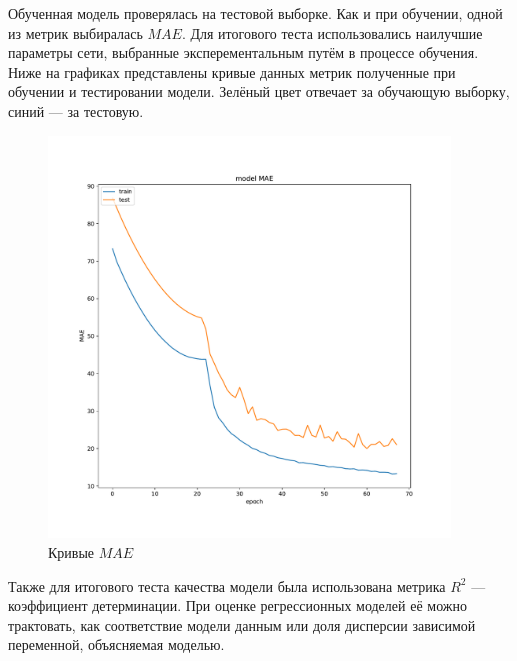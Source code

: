 \documentclass[14pt]{extarticle}
\begin{document}
Обученная модель проверялась на тестовой выборке. Как и при обучении, одной из метрик выбиралась $MAE$. Для итогового теста использовались наилучшие параметры сети, выбранные эксперементальным путём в процессе обучения. Ниже на графиках представлены кривые данных метрик полученные при обучении и тестировании модели. Зелёный цвет отвечает за обучающую выборку, синий --- за тестовую.

\begin{figure}[h]
	\centering
	\includegraphics[width=0.95\textwidth]{img/model_mae.pdf}
	\caption{Кривые $MAE$}
	\label{fig:test_mae}
\end{figure}

\newpage

Также для итогового теста качества модели была использована метрика $R^2$ --- коэффициент детерминации. При оценке регрессионных моделей её можно трактовать, как соответствие модели данным или доля дисперсии зависимой переменной, объясняемая моделью.
\end{document}
